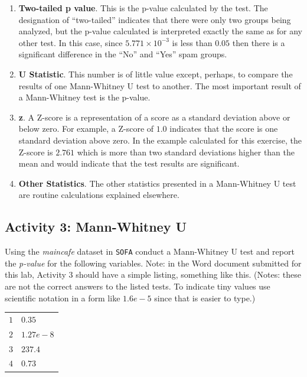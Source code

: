 \begin{enumerate}
  \item \textbf{Two-tailed p value}. This is the p-value calculated by the test. The designation of ``two-tailed'' indicates that there were only two groups being analyzed, but the p-value calculated is interpreted exactly the same as for any other test. In this case, since $ 5.771 \times 10^{-3} $ is less than $ 0.05 $ then there is a significant difference in the ``No'' and ``Yes'' spam groups.
  \item \textbf{U Statistic}. This number is of little value except, perhaps, to compare the results of one Mann-Whitney U test to another. The most important result of a Mann-Whitney test is the p-value.
  \item \textbf{z}. A Z-score is a representation of a score as a standard deviation above or below zero. For example, a Z-score of $ 1.0 $ indicates that the score is one standard deviation above zero. In the example calculated for this exercise, the Z-score is $ 2.761 $ which is more than two standard deviations higher than the mean and would indicate that the test results are significant.
  \item \textbf{Other Statistics}. The other statistics presented in a Mann-Whitney U test are routine calculations explained elsewhere.
  
\end{enumerate}

\subsection{Activity 3: Mann-Whitney U} \label{nonpara:act03}

Using the \textit{maincafe} dataset in \texttt{SOFA} conduct a Mann-Whitney U test and report the \textit{p-value} for the following variables. Note: in the Word document submitted for this lab, Activity $ 3 $ should have a simple listing, something like this. (Notes: these are not the correct answers to the listed tests. To indicate tiny values use scientific notation in a form like $ 1.6e-5 $ since that is easier to type.)

\begin{center}
  \begin{tabular}{ll}
    $ 1 $ & $ 0.35 $ \\ 
    $ 2 $ & $ 1.27e-8 $ \\ 
    $ 3 $ & $ 237.4 $ \\ 
    $ 4 $ & $ 0.73 $ \\ 
  \end{tabular} 
\end{center}

